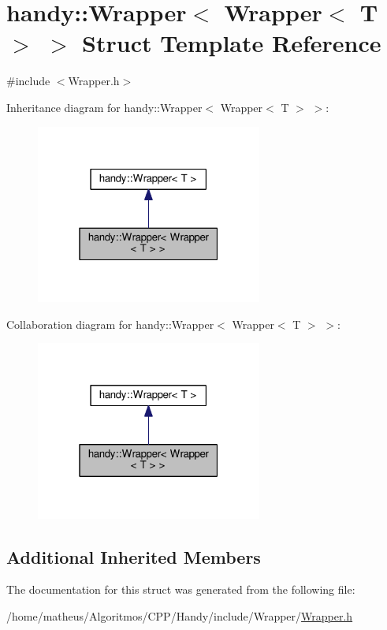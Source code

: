 \hypertarget{structhandy_1_1Wrapper_3_01Wrapper_3_01T_01_4_01_4}{}\section{handy\+:\+:Wrapper$<$ Wrapper$<$ T $>$ $>$ Struct Template Reference}
\label{structhandy_1_1Wrapper_3_01Wrapper_3_01T_01_4_01_4}


{\ttfamily \#include $<$Wrapper.\+h$>$}



Inheritance diagram for handy\+:\+:Wrapper$<$ Wrapper$<$ T $>$ $>$\+:\nopagebreak
\begin{figure}[H]
\begin{center}
\leavevmode
\includegraphics[width=211pt]{structhandy_1_1Wrapper_3_01Wrapper_3_01T_01_4_01_4__inherit__graph}
\end{center}
\end{figure}


Collaboration diagram for handy\+:\+:Wrapper$<$ Wrapper$<$ T $>$ $>$\+:\nopagebreak
\begin{figure}[H]
\begin{center}
\leavevmode
\includegraphics[width=211pt]{structhandy_1_1Wrapper_3_01Wrapper_3_01T_01_4_01_4__coll__graph}
\end{center}
\end{figure}
\subsection*{Additional Inherited Members}


The documentation for this struct was generated from the following file\+:\begin{DoxyCompactItemize}
\item 
/home/matheus/\+Algoritmos/\+C\+P\+P/\+Handy/include/\+Wrapper/\hyperlink{Wrapper_8h}{Wrapper.\+h}\end{DoxyCompactItemize}

